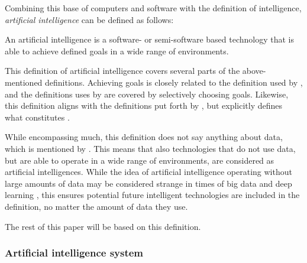 Combining this base of computers and software with the definition of intelligence, \textit{artificial intelligence} can be defined as follows:
\begin{displayquote}
    An artificial intelligence is a software- or semi-software based technology that is able to achieve defined goals in a wide range of environments.
\end{displayquote}

This definition of artificial intelligence covers several parts of the above-mentioned definitions. Achieving goals is closely related to the definition used by \textcite{Mikalef_2022}, and the definitions uses by \textcite{Brand_2022,Havrda_2020} are covered by selectively choosing goals. Likewise, this definition aligns with the definitions put forth by \textcite{Liu_2021,vanBruxvoort_2021}, but explicitly defines what constitutes .

While encompassing much, this definition does not say anything about data, which is mentioned by \textcite{Mikalef_2022,Dignum_2021}. This means that also technologies that do not use data, but are able to operate in a wide range of environments, are considered as artificial intelligences. While the idea of artificial intelligence operating without large amounts of data may be considered strange in times of big data \parencite{Singh_2022} and deep learning \parencite{Lecun_2015}, this ensures potential future intelligent technologies are included in the definition, no matter the amount of data they use.

The rest of this paper will be based on this definition.


\subsubsection{Artificial intelligence system}


